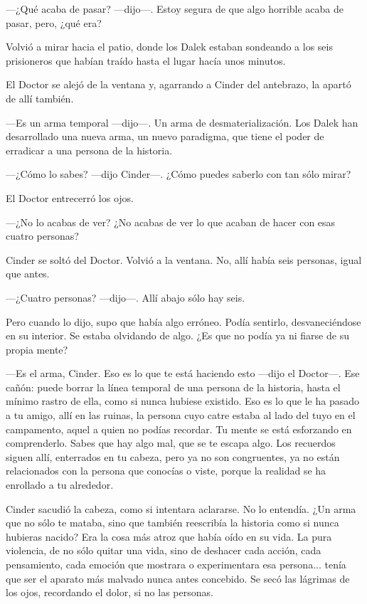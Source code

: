 —¿Qué acaba de pasar? —dijo—. Estoy segura de que algo horrible acaba de pasar, pero, ¿qué era?

Volvió a mirar hacia el patio, donde los Dalek estaban sondeando a los seis prisioneros que habían traído hasta el lugar hacía unos minutos.

El Doctor se alejó de la ventana y, agarrando a Cinder del antebrazo, la apartó de allí también.

—Es un arma temporal —dijo—. Un arma de desmaterialización. Los Dalek han desarrollado una nueva arma, un nuevo paradigma, que tiene el poder de erradicar a una persona de la historia.

—¿Cómo lo sabes? —dijo Cinder—. ¿Cómo puedes saberlo con tan sólo mirar?

El Doctor entrecerró los ojos.

—¿No lo acabas de ver? ¿No acabas de ver lo que acaban de hacer con esas cuatro personas?

Cinder se soltó del Doctor. Volvió a la ventana. No, allí había seis personas, igual que antes.

—¿Cuatro personas? —dijo—. Allí abajo sólo hay seis.

Pero cuando lo dijo, supo que había algo erróneo. Podía sentirlo, desvaneciéndose en su interior. Se estaba olvidando de algo. ¿Es que no podía ya ni fiarse de su propia mente?

—Es el arma, Cinder. Eso es lo que te está haciendo esto —dijo el Doctor—. Ese cañón: puede borrar la línea temporal de una persona de la historia, hasta el mínimo rastro de ella, como si nunca hubiese existido. Eso es lo que le ha pasado a tu amigo, allí en las ruinas, la persona cuyo catre estaba al lado del tuyo en el campamento, aquel a quien no podías recordar. Tu mente se está esforzando en comprenderlo. Sabes que hay algo mal, que se te escapa algo. Los recuerdos siguen allí, enterrados en tu cabeza, pero ya no son congruentes, ya no están relacionados con la persona que conocías o viste, porque la realidad se ha enrollado a tu alrededor.

Cinder sacudió la cabeza, como si intentara aclararse. No lo entendía. ¿Un arma que no sólo te mataba, sino que también reescribía la historia como si nunca hubieras nacido? Era la cosa más atroz que había oído en su vida. La pura violencia, de no sólo quitar una vida, sino de deshacer cada acción, cada pensamiento, cada emoción que mostrara o experimentara esa persona... tenía que ser el aparato más malvado nunca antes concebido. Se secó las lágrimas de los ojos, recordando el dolor, si no las personas.



